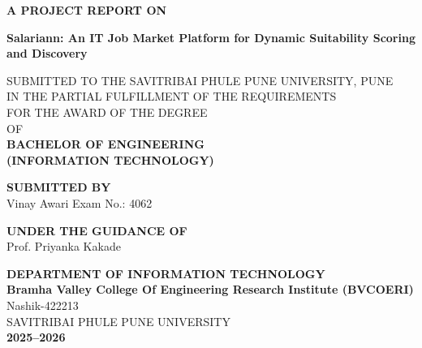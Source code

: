 \begin{titlepage}
    \begin{center}
        \vspace*{1cm}
        
        \textbf{\LARGE A PROJECT REPORT ON}
        
        \vspace{1.5cm}
        
        \textbf{\huge Salariann: An IT Job Market Platform for Dynamic Suitability Scoring and Discovery}
        
        \vspace{1.5cm}
        
        SUBMITTED TO THE SAVITRIBAI PHULE PUNE UNIVERSITY, PUNE \\
        IN THE PARTIAL FULFILLMENT OF THE REQUIREMENTS \\
        FOR THE AWARD OF THE DEGREE \\
        OF \\
        \vspace{0.5cm}
        \textbf{\Large BACHELOR OF ENGINEERING} \\
        \textbf{\large (INFORMATION TECHNOLOGY)}
        
        \vspace{1.5cm}
        
        \textbf{SUBMITTED BY} \\
        \vspace{0.5cm}
        Vinay Awari \hspace{2cm} Exam No.: 4062
        
        \vspace{1.5cm}
        
        \textbf{UNDER THE GUIDANCE OF} \\
        \vspace{0.5cm}
        Prof. Priyanka Kakade
        
        \vfill
        
        \textbf{DEPARTMENT OF INFORMATION TECHNOLOGY} \\
        \textbf{Bramha Valley College Of Engineering Research Institute (BVCOERI)} \\
        Nashik-422213 \\
        SAVITRIBAI PHULE PUNE UNIVERSITY \\
        \textbf{2025--2026}
        
    \end{center}
\end{titlepage}

